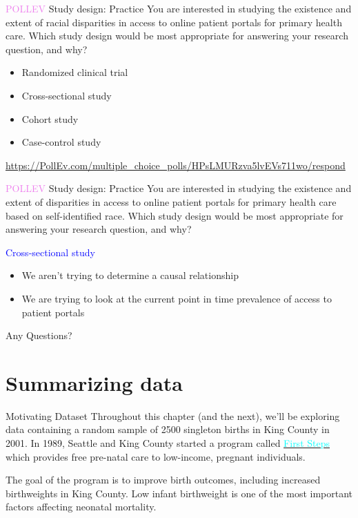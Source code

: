 \documentclass[10pt,t]{beamer}
\begin{document}
\begin{frame}{\textcolor{violet}{POLLEV} Study design: Practice}
	You are interested in studying the existence and extent of racial disparities in access to online patient portals for primary health care. Which study design would be most appropriate for answering your research question, and why?
	\bigskip
	
	\begin{itemize}
		\item Randomized clinical trial
		\item Cross-sectional study
		\item Cohort study
		\item Case-control study
	\end{itemize}
\medskip

\footnotesize
\url{https://PollEv.com/multiple_choice_polls/HPsLMURzva5lvEVs711wo/respond}
\end{frame}

\begin{frame}{\textcolor{violet}{POLLEV} Study design: Practice}
	You are interested in studying the existence and extent of disparities in access to online patient portals for primary health care based on self-identified race. Which study design would be most appropriate for answering your research question, and why?
	\bigskip
	
	\textcolor{blue}{Cross-sectional study}
	\bigskip
	
	\begin{itemize}
		\item We aren't trying to determine a causal relationship
		\item We are trying to look at the current point in time prevalence of access to patient portals
	\end{itemize}
\end{frame}

\begin{frame}[c]
\centering \huge Any Questions?
\end{frame}

\section{Summarizing data}


\begin{frame}{Motivating Dataset}
Throughout this chapter (and the next), we'll be exploring data containing a random sample of 2500 singleton births in King County in 2001. In 1989, Seattle and King County started a program called \href{https://kingcounty.gov/depts/health/child-teen-health/maternity-support-infant-case-management.aspx}{\textcolor{cyan}{First Steps}} which provides free pre-natal care to low-income, pregnant individuals. 

\vspace{0.3cm}

The goal of the program is to improve birth outcomes, including increased birthweights in King County. Low infant birthweight is one of the most important factors affecting neonatal mortality. 

\end{frame}
\end{document}
